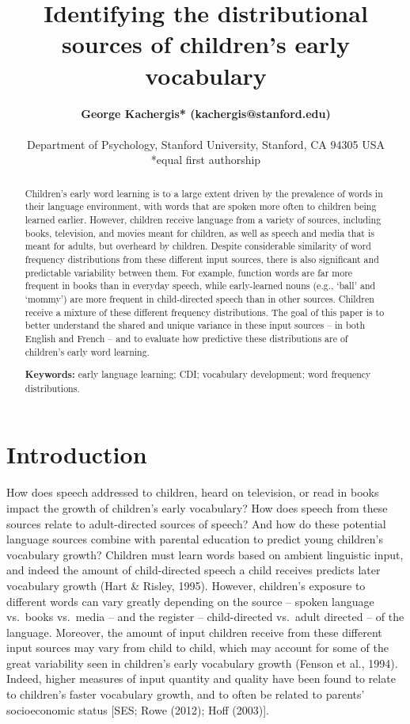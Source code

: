 \documentclass[10pt, letterpaper]{article}
\title{Identifying the distributional sources of children's early
vocabulary}
\author{{\large \bf George Kachergis* (kachergis@stanford.edu)} \AND {\large \bf Georgia Loukatou* (loukatou@stanford.edu)}  \AND {\large \bf Michael C. Frank (mcfrank@stanford.edu)} \\  \newline\\ Department of Psychology, Stanford University, Stanford, CA 94305 USA\\ *equal first authorship}
\begin{document}
\maketitle

\begin{abstract}
Children's early word learning is to a large extent driven by the
prevalence of words in their language environment, with words that are
spoken more often to children being learned earlier. However, children
receive language from a variety of sources, including books, television,
and movies meant for children, as well as speech and media that is meant
for adults, but overheard by children. Despite considerable similarity
of word frequency distributions from these different input sources,
there is also significant and predictable variability between them. For
example, function words are far more frequent in books than in everyday
speech, while early-learned nouns (e.g., `ball' and `mommy') are more
frequent in child-directed speech than in other sources. Children
receive a mixture of these different frequency distributions. The goal
of this paper is to better understand the shared and unique variance in
these input sources -- in both English and French -- and to evaluate how
predictive these distributions are of children's early word learning.

\textbf{Keywords:}
early language learning; CDI; vocabulary development; word frequency
distributions.
\end{abstract}

\hypertarget{introduction}{%
\section{Introduction}\label{introduction}}

How does speech addressed to children, heard on television, or read in
books impact the growth of children's early vocabulary? How does speech
from these sources relate to adult-directed sources of speech? And how
do these potential language sources combine with parental education to
predict young children's vocabulary growth? Children must learn words
based on ambient linguistic input, and indeed the amount of
child-directed speech a child receives predicts later vocabulary growth
(Hart \& Risley, 1995). However, children's exposure to different words
can vary greatly depending on the source -- spoken language vs.~books
vs.~media -- and the register -- child-directed vs.~adult directed -- of
the language. Moreover, the amount of input children receive from these
different input sources may vary from child to child, which may account
for some of the great variability seen in children's early vocabulary
growth (Fenson et al., 1994). Indeed, higher measures of input quantity
and quality have been found to relate to children's faster vocabulary
growth, and to often be related to parents' socioeconomic status {[}SES;
Rowe (2012); Hoff (2003){]}.
\end{document}
